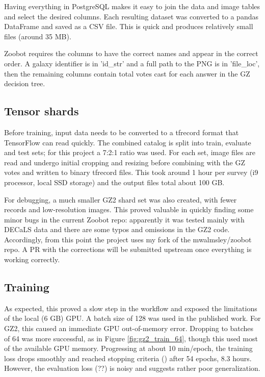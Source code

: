 \documentclass[twocolumn, twocolappendix, tighten]{aastex631}
\newcommand{\todo}{\color{red}{TODO}\color{black}\hspace{2mm}}
\begin{document}
Having everything in PostgreSQL makes it easy to join the data and image tables and select the desired columns. Each resulting dataset was converted to a pandas DataFrame and saved as a CSV file. This is quick and produces relatively small files (around 35 MB).

Zoobot requires the columns to have the correct names and appear in the correct order. A galaxy identifier is in 'id\_str' and a full path to the PNG is in 'file\_loc', then the remaining columns contain total votes cast for each answer in the GZ decision tree.

\subsection{Tensor shards}

Before training, input data needs to be converted to a tfrecord format that TensorFlow can read quickly. The combined catalog is split into train, evaluate and test sets; for this project a 7:2:1 ratio was used. For each set, image files are read and undergo initial cropping and resizing before combining with the GZ votes and written to binary tfrecord files. This took around 1 hour per survey (i9 processor, local SSD storage) and the output files total about 100 GB.

For debugging, a much smaller GZ2 shard set was also created, with fewer records and low-resolution images. This proved valuable in quickly finding some minor bugs in the current Zoobot repo: apparently it was tested mainly with DECaLS data and there are some typos and omissions in the GZ2 code. Accordingly, from this point the project uses my fork of the mwalmsley/zoobot repo. A PR with the corrections will be submitted upstream once everything is working correctly.

\subsection{Training}

As expected, this proved a slow step in the workflow and exposed the limitations of the local (6 GB) GPU. A batch size of 128 was used in the published work. For GZ2, this caused an immediate GPU out-of-memory error. Dropping to batches of 64 was more successful, as in Figure \ref{fig:gz2_train_64}, though this used most of the available GPU memory. Progressing at about 10 min/epoch, the training loss drops smoothly and reached stopping criteria (\todo) after 54 epochs, 8.3 hours. However, the evaluation loss (??) is noisy and suggests rather poor generalization.
\end{document}
